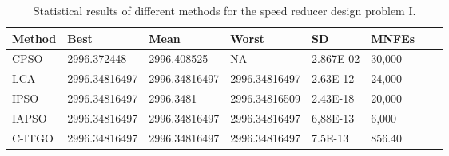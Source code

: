 
\begin{table*}[tp]
    \tiny
    \begin{center}
    
    \begin{tabular}{ P{2.0cm} P{2.0cm} P{2.0cm} P{2.0cm} P{2.0cm} P{2.0cm} P{2.0cm} P{2.0cm}  }
    \hline
    \textbf{Method} & \textbf{Best} & \textbf{Mean} & \textbf{Worst} & \textbf{SD} & \textbf{MNFEs} \\
    \hline
    
    CPSO & 2996.372448 & 2996.408525 & NA & 2.867E-02 & 30,000 \\
    LCA & 2996.34816497 & 2996.34816497 & 2996.34816497 & 2.63E-12 & 24,000 \\
    IPSO & 2996.34816497 & 2996.3481 & 2996.34816509 & 2.43E-18 & 20,000 \\
    IAPSO & 2996.34816497 & 2996.34816497 & 2996.34816497 & 6,88E-13 & 6,000 \\
    C-ITGO & 2996.34816497 & 2996.34816497 & 2996.34816497 & 7.5E-13 & 856.40 \\
        
    \hline
    \end{tabular}
    \end{center}
    
    \caption{ Statistical results of different methods for the speed reducer design problem I. \\[1em]}
    \label{tab:SP1}
    \end{table*}
    
    